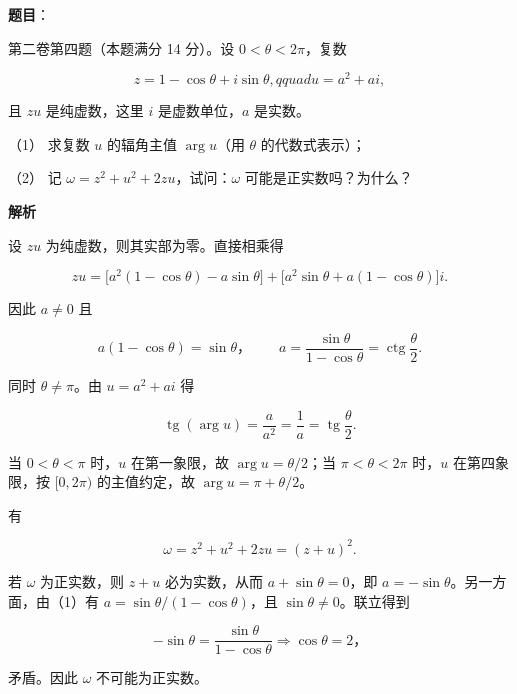 \begin{answer}

\textbf{题目}：

第二卷第四题（本题满分 14 分）。设 $0<\theta<2\pi$，复数

\nopagebreak[4]
\[
z=1-\cos\theta+i\sin\theta,qquad u=a^2+ai,
\]

且 $zu$ 是纯虚数，这里 $i$ 是虚数单位，$a$ 是实数。

（1） 求复数 $u$ 的辐角主值 $\arg u$（用 $\theta$ 的代数式表示）；

（2） 记 $\omega=z^2+u^2+2zu$，试问：$\omega$ 可能是正实数吗？为什么？

\textbf{解析}


设 $zu$ 为纯虚数，则其实部为零。直接相乘得

\nopagebreak[4]
\[
zu=\bigl[a^2(1-\cos\theta)-a\sin\theta\bigr]
+\bigl[a^2\sin\theta+a(1-\cos\theta)\bigr]i.
\]

因此 $a\ne0$ 且

\nopagebreak[4]
\[
a(1-\cos\theta)=\sin\theta\text{，}
\qquad
a=\frac{\sin\theta}{1-\cos\theta}=\operatorname{ctg}\frac\theta2.
\]

同时 $\theta\ne\pi$。由 $u=a^2+ai$ 得

\nopagebreak[4]
\[
\operatorname{tg}(\arg u)=\frac a{a^2}=\frac1a=\operatorname{tg}\frac\theta2.
\]

当 $0<\theta<\pi$ 时，$u$ 在第一象限，故 $\arg u=\theta/2$；当 $\pi<\theta<2\pi$ 时，$u$ 在第四象限，按 $[0,2\pi)$ 的主值约定，故 $\arg u=\pi+\theta/2$。


有

\nopagebreak[4]
\[
\omega=z^2+u^2+2zu=(z+u)^2.
\]

若 $\omega$ 为正实数，则 $z+u$ 必为实数，从而 $a+\sin\theta=0$，即 $a=-\sin\theta$。另一方面，由（1）有 $a=\sin\theta/(1-\cos\theta)$，且 $\sin\theta\ne0$。联立得到

\nopagebreak[4]
\[
-\sin\theta=\frac{\sin\theta}{1-\cos\theta}
\Longrightarrow \cos\theta=2\text{，}
\]

矛盾。因此 $\omega$ 不可能为正实数。



\end{answer}
